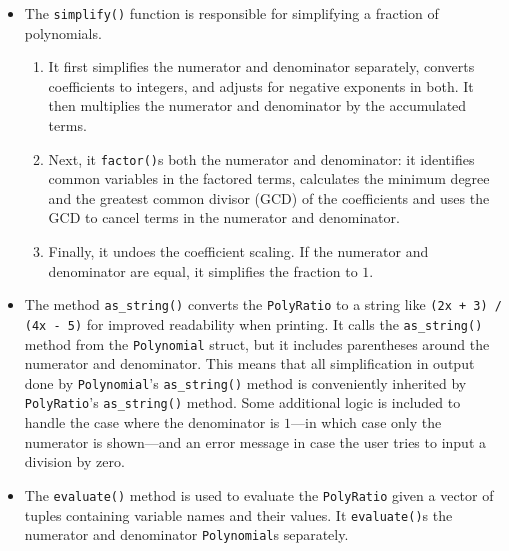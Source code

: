 \begin{itemize}
    \item The \verb|simplify()| function is responsible for simplifying a fraction of polynomials.
    
    \begin{enumerate}
        \item It first simplifies the numerator and denominator separately, converts coefficients to integers, and adjusts for negative exponents in both. It then multiplies the numerator and denominator by the accumulated terms.
        \item Next, it \verb|factor()|s both the numerator and denominator: it identifies common variables in the factored terms, calculates the minimum degree and the greatest common divisor (GCD) of the coefficients and uses the GCD to cancel terms in the numerator and denominator.
        \item Finally, it undoes the coefficient scaling. If the numerator and denominator are equal, it simplifies the fraction to $1$.
    \end{enumerate}

    \item The method \verb|as_string()| converts the \verb|PolyRatio| to a string like \texttt{(2x + 3) / (4x - 5)} for improved readability when printing. It calls the \verb|as_string()| method from the \verb|Polynomial| struct, but it includes parentheses around the numerator and denominator. This means that all simplification in output done by \verb|Polynomial|'s \verb|as_string()| method is conveniently inherited by \verb|PolyRatio|'s \verb|as_string()| method. Some additional logic is included to handle the case where the denominator is $1$---in which case only the numerator is shown---and an error message in case the user tries to input a division by zero.
    \item The \verb|evaluate()| method is used to evaluate the \verb|PolyRatio| given a vector of tuples containing variable names and their values. It \verb|evaluate()|s the numerator and denominator \verb|Polynomial|s separately.

\end{itemize}

